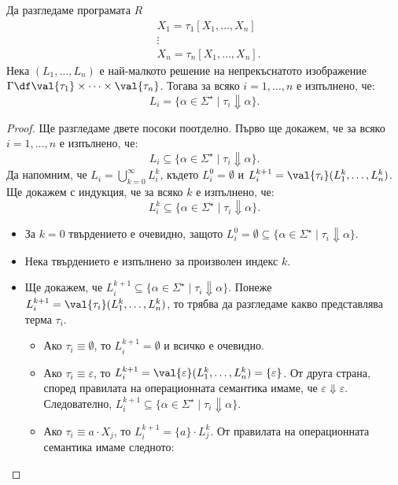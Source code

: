 \begin{theorem}
  Да разгледаме програмата $R$
  \begin{align*}
    & X_1 = \tau_1[X_1,\dots,X_n]\\
    & \vdots\\
    & X_n = \tau_n[X_1,\dots,X_n].
  \end{align*}
  Нека $(L_1,\dots,L_n)$ е най-малкото решение на непрекъснатото изображение $\Gamma \df \val{\tau_1}\times \cdots \times \val{\tau_n}$.
  Тогава за всяко $i = 1,\dots,n$ е изпълнено, че:
  \[L_i = \{\alpha \in \Sigma^\star \mid \tau_i \Downarrow \alpha\}.\]
\end{theorem}
\begin{proof}
  Ще разгледаме двете посоки поотделно.
  Първо ще докажем, че за всяко $i = 1,\dots,n$ е изпълнено, че:
  \[L_i \subseteq \{\alpha \in \Sigma^\star \mid \tau_i \Downarrow \alpha\}.\]
  Да напомним, че $L_i = \bigcup^\infty_{k=0} L^k_i$, където $L^0_i = \emptyset$ и $L^{k+1}_i = \val{\tau_i}(L^k_1,\dots,L^k_n)$.
  Ще докажем с индукция, че за всяко $k$ е изпълнено, че:
  \[L^k_i \subseteq \{\alpha \in \Sigma^\star \mid \tau_i \Downarrow \alpha\}.\]
  \begin{itemize}
  \item
    За $k = 0$ твърдението е очевидно, защото $L^0_i = \emptyset \subseteq \{\alpha \in \Sigma^\star \mid \tau_i \Downarrow \alpha\}$.
  \item
    Нека твърдението е изпълнено за произволен индекс $k$.
  \item
    Ще докажем, че $L^{k+1}_i \subseteq \{\alpha \in \Sigma^\star \mid \tau_i \Downarrow \alpha\}$.
    Понеже $L^{k+1}_i = \val{\tau_i}(L^k_1,\dots,L^k_n)$, то трябва да разгледаме какво представлява терма $\tau_i$.
    \begin{itemize}
    \item
      Ако $\tau_i \equiv \emptyset$, то $L^{k+1}_i = \emptyset$ и всичко е очевидно.
    \item
      Ако $\tau_i \equiv \varepsilon$, то $L^{k+1}_i  = \val{\varepsilon}(L^k_1,\dots,L^k_n) = \{\varepsilon\}$.
      От друга страна, според правилата на операционната семантика имаме, че $\varepsilon \Downarrow \varepsilon$.
      Следователно, $L^{k+1}_i \subseteq \{\alpha \in \Sigma^\star \mid \tau_i \Downarrow \alpha\}$.
    \item
      Ако $\tau_i \equiv a \cdot X_j$, то $L^{k+1}_i = \{a\} \cdot L^k_j$.
      От правилата на операционната семантика имаме следното:
      \begin{prooftree}

\end{prooftree}
\end{itemize}
\end{itemize}
\end{proof}
